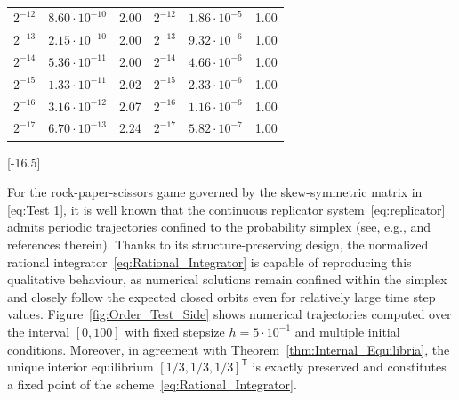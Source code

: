 \documentclass[11pt,letterpaper]{article}
\theoremstyle{remark}
\begin{document}
\begin{table}[!ht]
\begin{minipage}{\linewidth}
\begin{tabular}{|c|cc|c|cc|}
            $2^{-12}$ & $8.60\cdot10^{-10}$ & 2.00  & $2^{-12}$ & $1.86\cdot10^{-5}$ & 1.00  \\ 
            $2^{-13}$ & $2.15\cdot10^{-10}$ & 2.00  & $2^{-13}$ & $9.32\cdot10^{-6}$ & 1.00  \\ 
            $2^{-14}$ & $5.36\cdot10^{-11}$ & 2.00  & $2^{-14}$ & $4.66\cdot10^{-6}$ & 1.00  \\ 
            $2^{-15}$ & $1.33\cdot10^{-11}$ & 2.02  & $2^{-15}$ & $2.33\cdot10^{-6}$ & 1.00  \\ 
            $2^{-16}$ & $3.16\cdot10^{-12}$ & 2.07  & $2^{-16}$ & $1.16\cdot10^{-6}$ & 1.00  \\ 
            $2^{-17}$ & $6.70\cdot10^{-13}$ & 2.24  & $2^{-17}$ & $5.82\cdot10^{-7}$ & 1.00  \\ \hline
        \end{tabular}
        \captionsetup{labelformat=empty}
        \caption{}\vspace{-1.5\baselineskip}
        \label{tab:Order_Test_1}
    \end{minipage}
    [-16.5\baselineskip]
\end{table}

For the rock-paper-scissors game governed by the skew-symmetric matrix in \eqref{eq:Test 1}, it is well known that the continuous replicator system~\eqref{eq:replicator} admits periodic trajectories confined to the probability simplex (see, e.g., \cite{RPS_Closed,RPS_Closed_2} and references therein). Thanks to its structure-preserving design, the normalized rational integrator~\eqref{eq:Rational_Integrator} is capable of reproducing this qualitative behaviour, as numerical solutions remain confined within the simplex and closely follow the expected closed orbits even for relatively large time step values. Figure~\ref{fig:Order_Test_Side} shows numerical trajectories computed over the interval $[0,100]$ with fixed stepsize $h = 5 \cdot 10^{-1}$ and multiple initial conditions. Moreover, in agreement with Theorem~\ref{thm:Internal_Equilibria}, the unique interior equilibrium $[1/3,1/3,1/3]^\mathsf{T}$ is exactly preserved and constitutes a fixed point of the scheme~\eqref{eq:Rational_Integrator}.
\end{document}
